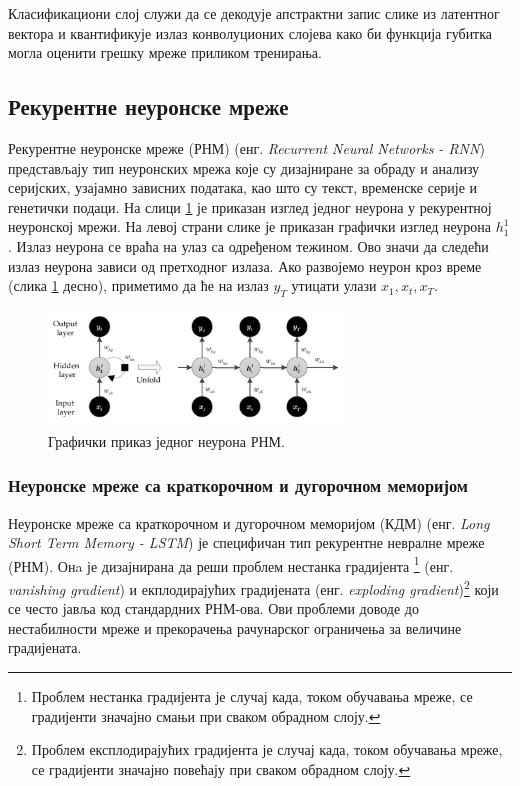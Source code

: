 \documentclass[a4paper, 12pt, master, utf8]{etf}
\begin{document}
Класификациони слој служи да се декодује апстрактни запис слике из латентног вектора и квантификује излаз конволуционих слојева како би функција губитка могла оценити
грешку мреже приликом тренирања.

\subsection{Рекурентне неуронске мреже}
\label{sec:233}

Рекурентне неуронске мреже (РНМ) (енг. \textit{Recurrent Neural Networks - RNN}) представљају тип неуронских мрежа које су дизајниране за обраду и анализу 
серијских, узајамно зависних података, као што су текст, временске серије и генетички подаци. На слици \ref{fig:rnn} је приказан изглед
једног неурона у рекурентној неуронској мрежи. На левој страни слике је приказан графички изглед неурона $h^{1}_1$. Излаз неурона се враћа на улаз са одређеном тежином.
Ово значи да следећи излаз неурона зависи од претходног излаза. Ако развојемо неурон кроз време (слика \ref*{fig:rnn} десно), приметимо да ће на излаз $y_T$ утицати
улази $x_1 , x_t, x_T$.

\begin{figure}[h]
    \centering
    \includegraphics[width=0.7\textwidth]{images/rnn.png}
    \caption{Графички приказ једног неурона РНМ. \cite{husein_day-ahead_2019}}
    \label{fig:rnn}
\end{figure}

\subsubsection{Неуронске мреже са краткорочном и дугорочном меморијом}

Неуронске мреже са краткорочном и дугорочном меморијом (КДМ) (енг. \textit{Long Short Term Memory - LSTM}) је специфичан тип рекурентне невралне мреже (РНМ).
Онa је дизајнирана да реши проблем нестанка градијента \footnote{Проблем нестанка градијента је случај када, током обучавања мреже, се градијенти значајно смањи при сваком обрадном слоју.} (енг. \textit{vanishing gradient}) и 
екплодирајућих градијената (енг. \textit{exploding gradient})\footnote{Проблем експлодирајућих градијента је случај када, током обучавања мреже, се градијенти значајно повећају при сваком обрадном слоју.} који се често јавља код стандардних РНМ-ова.
Ови проблеми доводе до нестабилности мреже и прекорачења рачунарског ограничења за величине градијената.
\newline
\end{document}
